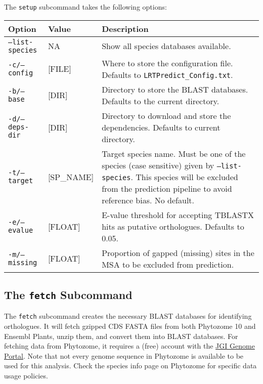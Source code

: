 \documentclass[12pt]{article}
\begin{document}
\par The \texttt{setup} subcommand takes the following options:
\begin{table}[H]
    \centering
    \begin{tabular}{p{105pt} l p{260pt}}
    \toprule
    Option & Value & Description \\
    \midrule
    \texttt{--list-species} & NA & Show all species databases available. \\
    \midrule
    \texttt{-c/--config} & [FILE] & Where to store the configuration file. Defaults to \texttt{LRTPredict\_Config.txt}. \\
    \midrule
    \texttt{-b/--base} & [DIR] & Directory to store the BLAST databases. Defaults to the current directory.\\
    \midrule
    \texttt{-d/--deps-dir} & [DIR] & Directory to download and store the dependencies. Defaults to current directory.\\
    \midrule
    \texttt{-t/--target} & [SP\_NAME] & Target species name. Must be one of the species (case sensitive) given by \texttt{--list-species}. This species will be excluded from the prediction pipeline to avoid reference bias. No default.\\
    \midrule
    \texttt{-e/--evalue} & [FLOAT] & E-value threshold for accepting TBLASTX hits as putative orthologues. Defaults to 0.05.\\
    \midrule
    \texttt{-m/--missing} & [FLOAT] & Proportion of gapped (missing) sites in the MSA to be excluded from prediction.\\
    \bottomrule
    \end{tabular}
\end{table}

\subsection*{The \texttt{fetch} Subcommand}
\par The \texttt{fetch} subcommand creates the necessary BLAST databases for
identifying orthologues. It will fetch gzipped CDS FASTA files from both
Phytozome 10 and Ensembl Plants, unzip them, and convert them into BLAST
databases. For fetching data from Phytozome, it requires a (free) account with
the \href{http://genome.jgi.doe.gov/}{JGI Genome Portal}. Note that not every
genome sequence in Phytozome is available to be used for this analysis. Check
the species info page on Phytozome for specific data usage policies.
\end{document}
